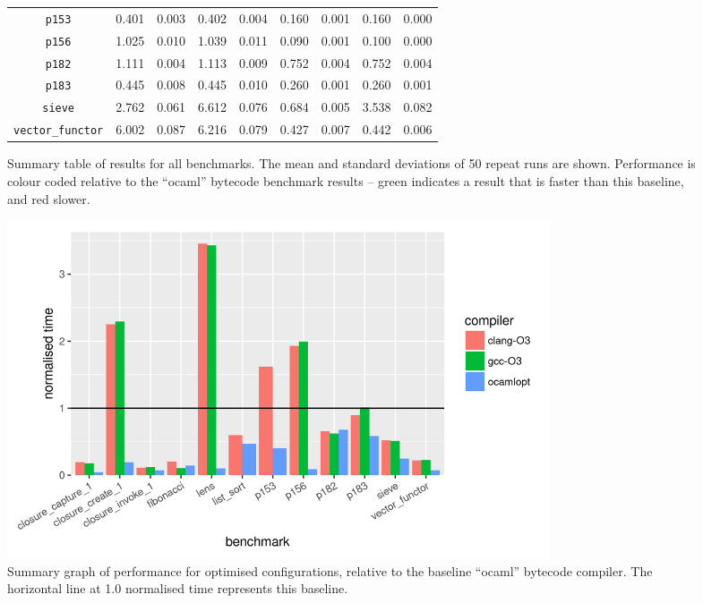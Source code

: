 \documentclass[12pt,a4paper,twoside,openright]{report}
\begin{document}
\begin{figure}[h]
\begin{tabular}{| c | c c | c c | c c | c c |}
\lstinline!p153!              & \cellcolor[hsb]{0.3,0.000,1}0.401 & 0.003 & \cellcolor[hsb]{0.0,0.001,1}0.402 & 0.004 & \cellcolor[hsb]{0.3,0.601,1}0.160 & 0.001 & \cellcolor[hsb]{0.3,0.601,1}0.160 & 0.000 \\
\lstinline!p156!              & \cellcolor[hsb]{0.3,0.000,1}1.025 & 0.010 & \cellcolor[hsb]{0.0,0.007,1}1.039 & 0.011 & \cellcolor[hsb]{0.3,0.912,1}0.090 & 0.001 & \cellcolor[hsb]{0.3,0.902,1}0.100 & 0.000 \\
\lstinline!p182!              & \cellcolor[hsb]{0.3,0.000,1}1.111 & 0.004 & \cellcolor[hsb]{0.0,0.000,1}1.113 & 0.009 & \cellcolor[hsb]{0.3,0.323,1}0.752 & 0.004 & \cellcolor[hsb]{0.3,0.323,1}0.752 & 0.004 \\
\lstinline!p183!              & \cellcolor[hsb]{0.3,0.000,1}0.445 & 0.008 & \cellcolor[hsb]{0.3,0.000,1}0.445 & 0.010 & \cellcolor[hsb]{0.3,0.416,1}0.260 & 0.001 & \cellcolor[hsb]{0.3,0.416,1}0.260 & 0.001 \\
\lstinline!sieve!             & \cellcolor[hsb]{0.3,0.000,1}2.762 & 0.061 & \cellcolor[hsb]{0.0,0.697,1}6.612 & 0.076 & \cellcolor[hsb]{0.3,0.752,1}0.684 & 0.005 & \cellcolor[hsb]{0.0,0.141,1}3.538 & 0.082 \\
\lstinline!vector_functor!    & \cellcolor[hsb]{0.3,0.000,1}6.002 & 0.087 & \cellcolor[hsb]{0.0,0.018,1}6.216 & 0.079 & \cellcolor[hsb]{0.3,0.929,1}0.427 & 0.007 & \cellcolor[hsb]{0.3,0.926,1}0.442 & 0.006 \\
\hline
\end{tabular}

\caption{Summary table of results for all benchmarks. The mean and standard deviations of 50 repeat runs are shown. Performance is colour coded relative to the ``ocaml'' bytecode benchmark results -- green indicates a result that is faster than this baseline, and red slower.}\label{benchmark-table}
\end{figure}

\begin{figure}
\centering
  \includegraphics[width=16cm]{resultsummary-b477d4580}

\caption{Summary graph of performance for optimised configurations, relative to
the baseline ``ocaml'' bytecode compiler. The horizontal line at 1.0 normalised
time represents this baseline.}\label{graph-summary}
\end{figure}
\end{document}
